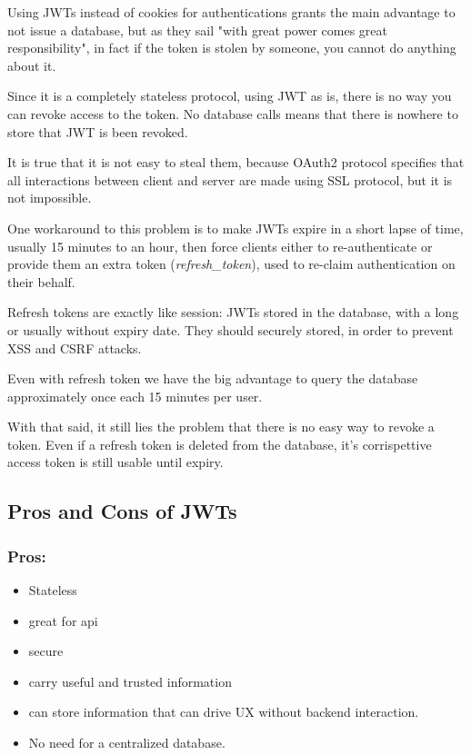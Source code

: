 \documentclass[20pt]{style}
\begin{document}
Using JWTs instead of cookies for authentications grants the main advantage to
not issue a database, but as they sail "with great power comes great
responsibility", in fact if the token is stolen by someone, you cannot do
anything about it.

Since it is a completely stateless protocol, using JWT as is, there is no way
you can revoke access to the token. No database calls means that there is
nowhere to store that JWT is been revoked.

It is true that it is not easy to steal them, because OAuth2 protocol specifies
that all interactions between client and server are made using SSL protocol, but
it is not impossible.

One workaround to this problem is to make JWTs expire in a short lapse of time,
usually 15 minutes to an hour, then force clients either to re-authenticate or
provide them an extra token (\textit{refresh\_token}), used to re-claim
authentication on their behalf.

Refresh tokens are exactly like session: JWTs stored in the database, with a
long or usually without expiry date.
They should securely stored, in order to prevent XSS and CSRF attacks.

Even with refresh token we have the big advantage to query the database
approximately once each 15 minutes per user.

With that said, it still lies the problem that there is no easy way to revoke a
token. Even if a refresh token is deleted from the database, it's corrispettive
access token is still usable until expiry.

\subsection{Pros and Cons of JWTs}
\subsubsection{Pros:}
\begin{itemize}
    \item Stateless
    \item great for api
    \item secure
    \item carry useful and trusted information
    \item can store information that can drive UX without backend interaction.
    \item No need for a centralized database.
\end{itemize}
\end{document}
